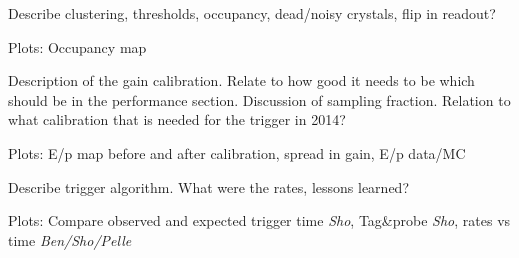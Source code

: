 
\vspace{1cm}{\bf ECal performance [Sho]}


Describe clustering, thresholds, occupancy, dead/noisy crystals, flip in readout?

Plots: Occupancy map

\vspace{1cm}{\bf ECal Calibration [Sho]}


Description of the gain calibration. Relate to how good it needs to be which should be in the performance section. Discussion of sampling fraction. Relation to what calibration that is needed for the trigger in 2014?

Plots: E/p map before and after calibration, spread in gain, E/p data/MC


\vspace{1cm}{\bf Trigger performance [Sho/Ben]}


Describe trigger algorithm. What were the rates, lessons learned?

Plots: Compare observed and expected trigger time {\it Sho}, Tag\&probe {\it Sho}, rates vs time {\it Ben/Sho/Pelle}


